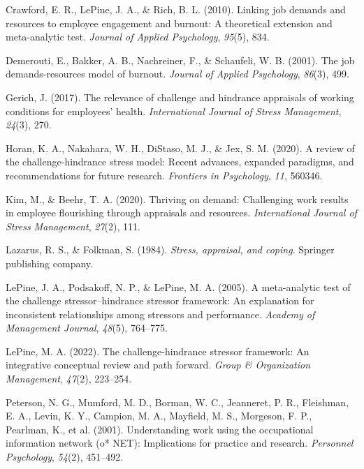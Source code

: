 \documentclass[
  jou,mask]{apa6}
\newlength{\cslhangindent}
\newlength{\cslentryspacingunit} %
\newenvironment{CSLReferences}[2] %
 {%
  \setlength{\parindent}{0pt}
  \ifodd #1
  \let\oldpar\par
  \def\par{\hangindent=\cslhangindent\oldpar}
  \fi
  \setlength{\parskip}{#2\cslentryspacingunit}
 }%
 {}
\begin{document}
\begin{CSLReferences}{1}{0}
\leavevmode{}%
Crawford, E. R., LePine, J. A., \& Rich, B. L. (2010). Linking job demands and resources to employee engagement and burnout: A theoretical extension and meta-analytic test. \emph{Journal of Applied Psychology}, \emph{95}(5), 834.

\leavevmode{}%
Demerouti, E., Bakker, A. B., Nachreiner, F., \& Schaufeli, W. B. (2001). The job demands-resources model of burnout. \emph{Journal of Applied Psychology}, \emph{86}(3), 499.

\leavevmode{}%
Gerich, J. (2017). The relevance of challenge and hindrance appraisals of working conditions for employees' health. \emph{International Journal of Stress Management}, \emph{24}(3), 270.

\leavevmode{}%
Horan, K. A., Nakahara, W. H., DiStaso, M. J., \& Jex, S. M. (2020). A review of the challenge-hindrance stress model: Recent advances, expanded paradigms, and recommendations for future research. \emph{Frontiers in Psychology}, \emph{11}, 560346.

\leavevmode{}%
Kim, M., \& Beehr, T. A. (2020). Thriving on demand: Challenging work results in employee flourishing through appraisals and resources. \emph{International Journal of Stress Management}, \emph{27}(2), 111.

\leavevmode{}%
Lazarus, R. S., \& Folkman, S. (1984). \emph{Stress, appraisal, and coping}. Springer publishing company.

\leavevmode{}%
LePine, J. A., Podsakoff, N. P., \& LePine, M. A. (2005). A meta-analytic test of the challenge stressor--hindrance stressor framework: An explanation for inconsistent relationships among stressors and performance. \emph{Academy of Management Journal}, \emph{48}(5), 764--775.

\leavevmode{}%
LePine, M. A. (2022). The challenge-hindrance stressor framework: An integrative conceptual review and path forward. \emph{Group \& Organization Management}, \emph{47}(2), 223--254.

\leavevmode{}%
Peterson, N. G., Mumford, M. D., Borman, W. C., Jeanneret, P. R., Fleishman, E. A., Levin, K. Y., Campion, M. A., Mayfield, M. S., Morgeson, F. P., Pearlman, K., et al. (2001). Understanding work using the occupational information network (o* NET): Implications for practice and research. \emph{Personnel Psychology}, \emph{54}(2), 451--492.


\end{CSLReferences}
\end{document}
